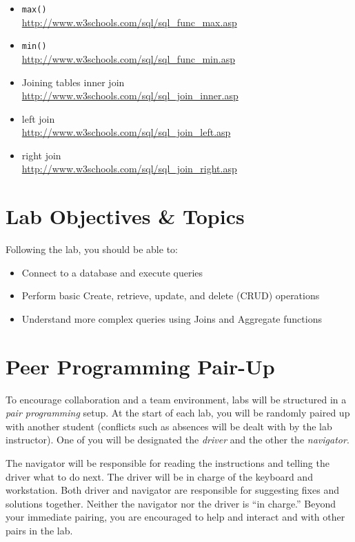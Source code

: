 \documentclass[12pt]{scrartcl}
\begin{document}
\begin{enumerate}
\begin{itemize}
    \item \texttt{max()}	\\ \url{http://www.w3schools.com/sql/sql_func_max.asp}
    \item \texttt{min()}	\\ \url{http://www.w3schools.com/sql/sql_func_min.asp}
    \item Joining tables	inner join	\\ 
    \url{http://www.w3schools.com/sql/sql_join_inner.asp} 
	\item left join	\\ 
    \url{http://www.w3schools.com/sql/sql_join_left.asp} 
	\item right join	\\ 
    \url{http://www.w3schools.com/sql/sql_join_right.asp} 
  \end{itemize}  
\end{enumerate}

\section*{Lab Objectives \& Topics}
Following the lab, you should be able to:
\begin{itemize}
  \item Connect to a database and execute queries
  \item Perform basic Create, retrieve, update, and delete (CRUD) operations
  \item Understand more complex queries using Joins and Aggregate functions
\end{itemize}

\section*{Peer Programming Pair-Up}

To encourage collaboration and a team environment, labs will be
structured in a \emph{pair programming} setup.  At the start of
each lab, you will be randomly paired up with another student 
(conflicts such as absences will be dealt with by the lab instructor).
One of you will be designated the \emph{driver} and the other
the \emph{navigator}.  

The navigator will be responsible for reading the instructions and
telling the driver what to do next.  The driver will be in charge of the
keyboard and workstation.  Both driver and navigator are responsible
for suggesting fixes and solutions together.  Neither the navigator
nor the driver is ``in charge.''  Beyond your immediate pairing, you
are encouraged to help and interact and with other pairs in the lab.
\end{document}
